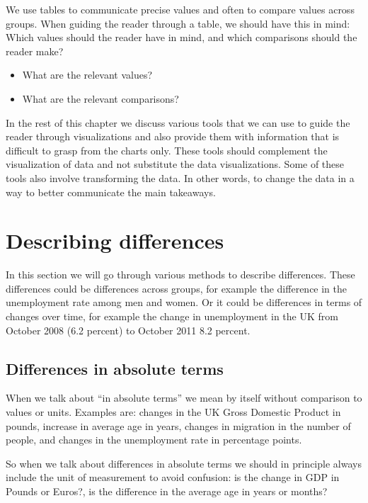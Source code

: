 \documentclass[
]{book}
\providecommand{\tightlist}{%
  \setlength{\itemsep}{0pt}\setlength{\parskip}{0pt}}
\begin{document}
We use tables to communicate precise values and often to compare values across groups. When guiding the reader through a table, we should have this in mind: Which values should the reader have in mind, and which comparisons should the reader make?

\begin{itemize}
\tightlist
\item
  What are the relevant values?
\item
  What are the relevant comparisons?
\end{itemize}

In the rest of this chapter we discuss various tools that we can use to guide the reader through visualizations and also provide them with information that is difficult to grasp from the charts only. These tools should complement the visualization of data and not substitute the data visualizations. Some of these tools also involve transforming the data. In other words, to change the data in a way to better communicate the main takeaways.

\hypertarget{describing-differences}{%
\section{Describing differences}\label{describing-differences}}

In this section we will go through various methods to describe differences. These differences could be differences across groups, for example the difference in the unemployment rate among men and women. Or it could be differences in terms of changes over time, for example the change in unemployment in the UK from October 2008 (6.2 percent) to October 2011 8.2 percent.

\hypertarget{differences-in-absolute-terms}{%
\subsection*{Differences in absolute terms}\label{differences-in-absolute-terms}}

When we talk about ``in absolute terms'' we mean by itself without comparison to values or units. Examples are: changes in the UK Gross Domestic Product in pounds, increase in average age in years, changes in migration in the number of people, and changes in the unemployment rate in percentage points.

So when we talk about differences in absolute terms we should in principle always include the unit of measurement to avoid confusion: is the change in GDP in Pounds or Euros?, is the difference in the average age in years or months?
\end{document}
